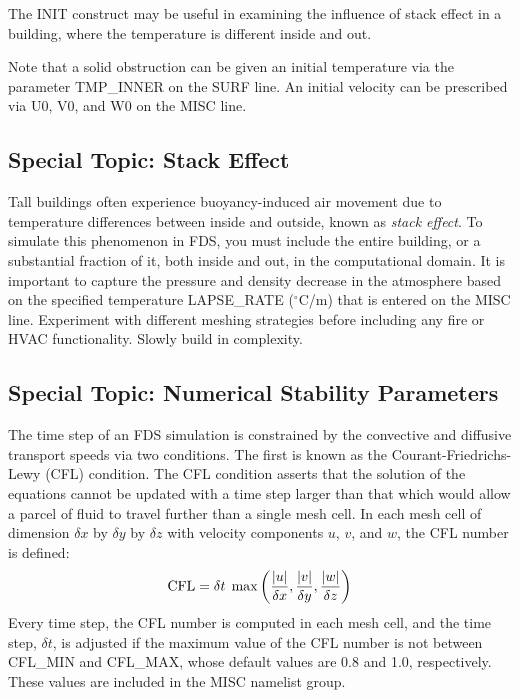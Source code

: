 \documentclass[11pt]{book}
\newcommand{\dx}{\delta x}
\newcommand{\dy}{\delta y}
\newcommand{\dz}{\delta z}
\newcommand{\dt}{\delta t}
\newcommand{\hu}{u}
\newcommand{\hv}{v}
\newcommand{\hw}{w}
\newcommand{\be}{\begin{equation}}
\newcommand{\ee}{\end{equation}}
\begin{document}
The {\ct INIT} construct may be useful in examining the influence of stack effect
in a building, where the temperature is different inside and out.

Note that a solid obstruction can be given an initial temperature via the
parameter {\ct TMP\_INNER} on the {\ct SURF} line. An initial velocity can be prescribed via
{\ct U0}, {\ct V0}, and {\ct W0} on the {\ct MISC} line.


\subsection{Special Topic: Stack Effect}
\label{info:stackeffect}

Tall buildings often experience buoyancy-induced air movement due to temperature differences
between inside and outside, known as {\em stack effect}. To simulate this phenomenon in FDS, you must
include the entire building, or a substantial fraction of it, both inside and out, in the computational domain. It
is important to capture the pressure and density decrease in the atmosphere based on the specified
temperature {\ct LAPSE\_RATE} ($^\circ$C/m) that is entered on the {\ct MISC} line. Experiment with different meshing
strategies before including any fire or HVAC functionality. Slowly build in complexity.


\subsection{Special Topic: Numerical Stability Parameters}
\label{info:CFL}

The time step of an FDS simulation is constrained by the convective and diffusive
transport speeds via two conditions. The first is known as the
Courant-Friedrichs-Lewy (CFL) condition. The CFL condition asserts that the solution of the equations cannot be updated with a time step
larger than that which would allow a parcel of fluid to travel further than a single mesh cell.
In each mesh cell of dimension $\dx$ by $\dy$ by $\dz$ with velocity
components $u$, $v$, and $w$, the CFL number is defined:
\be \hbox{CFL} = \dt \; \max \left(\frac{|\hu|}{\dx},\frac{|\hv|}{\dy},\frac{|\hw|}{\dz} \right)   \label{cfl}
\ee
Every time step, the CFL number is computed in each mesh cell, and the time step, $\dt$, is adjusted if the
maximum value of the CFL number is not between {\ct CFL\_MIN} and {\ct CFL\_MAX}, whose default values are
0.8 and 1.0, respectively. These values are included in the {\ct MISC} namelist group.
\end{document}
